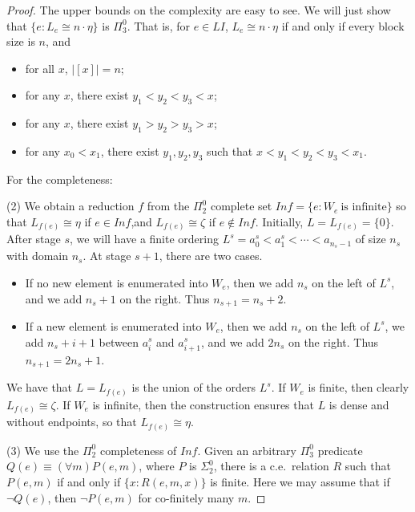 \documentclass[11pt]{amsart}
\theoremstyle{definition}
\begin{document}
\begin{proof} The upper bounds on the complexity are easy to see. 
We will just show that  $\{e: L_e \cong n \cdot \eta\}$ is $\Pi^0_3$.
That is, for $e \in LI$, $L_e \cong n \cdot \eta$ if and only if every block size is $n$, and 
\begin{itemize}
\item for all $x$, $|[x]| = n$;
\item for any $x$, there exist $y_1 < y_2 < y_3 < x$;
\item for any $x$, there exist $y_1 > y_2 > y_3 > x$;
\item for any $x_0 < x_1$, there exist $y_1,y_2,y_3$ such that 
$x < y_1 < y_2 < y_3 < x_1$. 
\end{itemize}

\medskip

For the completeness:

(2) We obtain a reduction $f$ from the $\Pi^0_2$ complete set $Inf = \{e: W_e\ \text{is infinite}\}$ so that $L_{f(e)} \cong \eta$ if $e \in Inf$,and $L_{f(e)} \cong \zeta$ if $e \notin Inf$. Initially, $L = L_{f(e)} = \{0\}$. After stage $s$, we will have a finite ordering $L^s = a_0^s < a_1^s < \dotsb < a_{n_s -1}$ of size $n_s$ with domain $n_s$.  At stage $s+1$, there are two cases.

\begin{itemize}
    \item If no new element is enumerated into $W_e$, then we add $n_s$ on the left of $L^s$,  and we add $n_s+1$ on the right. Thus $n_{s+1} = n_s+2$.
    \item If a new element is enumerated into $W_e$, then we add $n_s$ on the left of $L^s$,
    we add $n_s+i+1$ between $a_i^s$ and $a_{i+1}^s$, and we add $2n_s$ on the right. Thus $n_{s+1} = 2n_s+1$. 
\end{itemize}

We have that $L = L_{f(e)}$ is the union of the orders $L^s$. If $W_e$ is finite, then clearly $L_{f(e)} \cong \zeta$. If $W_e$ is infinite, then the construction ensures that $L$ is dense and without endpoints, so that $L_{f(e)} \cong \eta$. 


(3) We use the $\Pi^0_2$ completeness of $Inf$. Given an arbitrary $\Pi^0_3$ predicate $Q(e) \equiv (\forall m) P(e,m)$, where $P$ is $\Sigma^0_2$, there is a c.e.\ relation $R$ such that $P(e,m)$ if and only if $\{x: R(e,m,x)\}$ is finite. Here we may assume that if $\neg Q(e)$, then $\neg P(e,m)$ for co-finitely many $m$. 


\end{proof}
\end{document}
